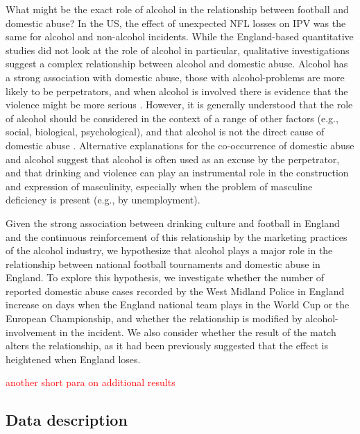 \documentclass[12pt, letterpaper]{article}
\begin{document}
What might be the exact role of alcohol in the relationship between football and domestic abuse? In the US, the effect of unexpected NFL losses on IPV was the same for alcohol and non-alcohol incidents\autocite{Card2011}. While the England-based quantitative studies did not look at the role of alcohol in particular, qualitative investigations suggest a complex relationship between alcohol and domestic abuse. Alcohol has a strong association with domestic abuse, those with alcohol-problems are more likely to be perpetrators, and when alcohol is involved there is evidence that the violence might be more serious \autocite{Peralta2010}. However, it is generally understood that the role of alcohol should be considered in the context of a range of other factors (e.g., social, biological, psychological), and that alcohol is not the direct cause of domestic abuse \autocite{Javaid2015,Peralta2010}. Alternative explanations for the co-occurrence of domestic abuse and alcohol suggest that alcohol is often used as an excuse by the perpetrator\autocite{Javaid2015}, and that drinking and violence can play an instrumental role in the construction and expression of masculinity, especially when the problem of masculine deficiency is present (e.g., by unemployment)\autocite{Peralta2010}. 

Given the strong association between drinking culture and football in England\autocite{Dixon2014} and the continuous reinforcement of this relationship by the marketing practices of the alcohol industry\autocite{Gornall2014}, we hypothesize that alcohol plays a major role in the relationship between national football tournaments and domestic abuse in England. To explore this hypothesis, we investigate whether the number of reported domestic abuse cases recorded by the West Midland Police in England increase on days when the England national team plays in the World Cup or the European Championship, and whether the relationship is modified by alcohol-involvement in the incident. We also consider whether the result of the match alters the relationship, as it had been previously suggested that the effect is heightened when England loses\autocite{Kirby2014}.

\textcolor{red}{another short para on additional results}



\subsection{Data description}
\end{document}
